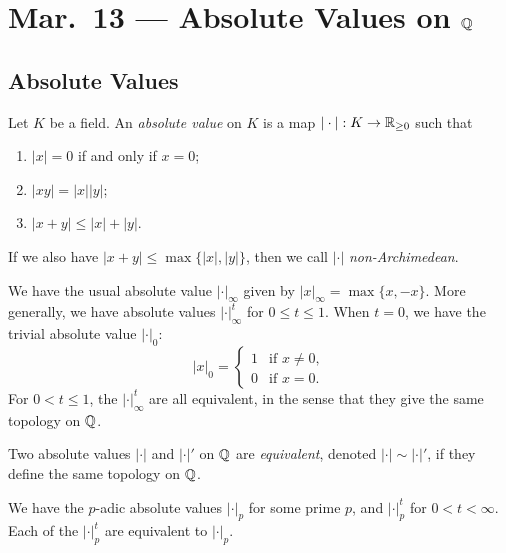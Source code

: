 \chapter{Mar.~13 --- Absolute Values on \texorpdfstring{$\mathbb{Q}$}{Q}}

\section{Absolute Values}

\begin{definition}
  Let $K$ be a field. An \emph{absolute value} on $K$
  is a map $|\cdot| : K \to \mathbb{R}_{\ge 0}$ such that
  \begin{enumerate}
    \item $|x| = 0$ if and only if $x = 0$;
    \item $|xy| = |x| |y|$;
    \item $|x + y| \le |x| + |y|$.
  \end{enumerate}
  If we also have $|x + y| \le \max\{|x|, |y|\}$,
  then we call $|\cdot|$
  \emph{non-Archimedean}.
\end{definition}

\begin{example}
  We have the usual absolute value $|\cdot|_{\infty}$
  given by
  $|x|_{\infty} = \max\{x, -x\}$. More generally, we
  have absolute values $|\cdot|_{\infty}^t$ for
  $0 \le t \le 1$. When $t = 0$, we have the
  trivial absolute value $|\cdot|_0$:
  \[
    |x|_0 =
    \begin{cases}
      1 & \text{if } x \ne 0, \\
      0 & \text{if } x = 0.
    \end{cases}
  \]
  For $0 < t \le 1$, the
  $|\cdot|_{\infty}^t$ are all equivalent, in the
  sense that they give the same topology on $\mathbb{Q}$.
\end{example}

\begin{definition}
  Two absolute values
  $|\cdot|$ and $|\cdot|'$ on $\mathbb{Q}$ are \emph{equivalent},
  denoted $|\cdot| \sim |\cdot|'$, if they define the
  same topology on $\mathbb{Q}$.
\end{definition}

\begin{example}
  We have the $p$-adic absolute values $|\cdot|_p$ for
  some prime $p$, and $|\cdot|_p^t$ for $0 < t < \infty$.
  Each of the $|\cdot|_p^t$ are equivalent to
  $|\cdot|_p$.
\end{example}

